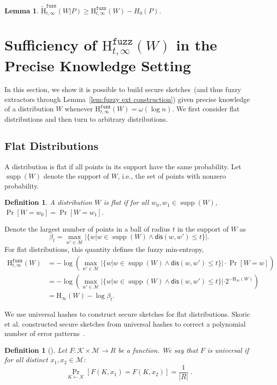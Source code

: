\documentclass[11pt]{article}
\newcommand{\supp}{\operatorname{supp}}
\newcommand{\lemref}[1]{\mbox{Lemma~\ref{#1}}}
\newcommand{\dis}{\ensuremath{\mathsf{dis}}}
\newcommand{\Hoo}{\mathrm{H}_\infty}
\newcommand{\Hfuzz}{\mathrm{H}^{\mathtt{fuzz}}_{t,\infty}}
\newcommand{\Hfav}{\tilde{\mathrm{H}}^{\mathtt{fuzz}}_{t,\infty}}
\newtheorem{lemma}[theorem]{Lemma}
\newtheorem{definition}[theorem]{Definition}
\newcommand{\M}{\mathcal{M}}
\begin{document}
\noindent

\begin{lemma}
\label{lem:chain rule fuzz}
$\Hfav(W|P) \ge \Hfuzz(W) - H_0(P)$.
\end{lemma}


\section{Sufficiency of $\Hfuzz(W)$ in the Precise Knowledge Setting}
\label{sec:known distributions}
In this section, we show it is possible to build secure sketches~(and thus fuzzy extractors through \lemref{lem:fuzzy ext construction}) given precise knowledge of a distribution $W$ whenever $\Hfuzz(W)= \omega(\log n)$.
We first consider flat distributions and then turn to arbitrary distributions.

\subsection{Flat Distributions}
A distribution is flat if all points in its support have the same probability. Let $\supp(W)$ denote the support of $W$, i.e., the set of points with nonzero probability.
\begin{definition}
A distribution $W$ is \emph{flat} if for all $w_0, w_1 \in \supp(W)$,  $\Pr[W=w_0] = \Pr[W=w_1]$.  
\end{definition}

Denote the largest number of points in a ball of radius $t$ in the support of $W$ as \[\beta_{t} = \max_{w'\in\M} |\{w | w\in \supp(W) \wedge \dis(w ,w')\le t\}|.\]   For flat distributions, this quantity defines the fuzzy min-entropy,
\begin{align}
\Hfuzz(W) &= -\log \left(\max_{w' \in \mathcal{M}} \left| \{w | w\in \supp(W) \wedge \dis(w, w')\le t\} \right|\cdot \Pr[W=w]\right) \nonumber \\
&= -\log\left( \max_{w' \in \mathcal{M}} |\{w | w\in \supp(W) \wedge \dis(w, w')\le t\}| \cdot 2^{-\Hoo(W)}\right) \nonumber \\
&= \Hoo(W) -\log \beta_{t}.\label{eq:fuzz for flat}
\end{align}

\noindent We use universal hashes to construct secure sketches for flat distributions.  Skoric et al. constructed secure sketches from universal hashes to correct a polynomial number of error patterns~\cite{skoric2009efficient}.


\begin{definition}[\cite{DBLP:journals/jcss/CarterW79}]
Let $F : \mathcal{K} \times \mathcal{M} \to R$ be a function.  We say that $F$ is \emph{universal} if for all distinct $x_1, x_2 \in \mathcal{M}$:
\[
 \Pr_{K \leftarrow \mathcal{K}}[F(K, x_1) = F(K, x_2)] = \frac{1}{|R|} \;.
\]
\end{definition}
\end{document}
